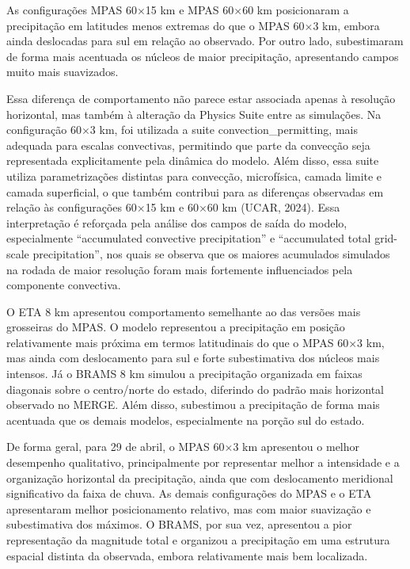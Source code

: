 \documentclass[12pt,a4paper,oneside]{book}
\begin{document}
As configurações MPAS 60$\times$15 km e MPAS 60$\times$60 km posicionaram a precipitação em latitudes menos extremas do que o MPAS 60$\times$3 km, embora ainda deslocadas para sul em relação ao observado. Por outro lado, subestimaram de forma mais acentuada os núcleos de maior precipitação, apresentando campos muito mais suavizados.

Essa diferença de comportamento não parece estar associada apenas à resolução horizontal, mas também à alteração da Physics Suite entre as simulações. Na configuração 60$\times$3 km, foi utilizada a suite convection\_permitting, mais adequada para escalas convectivas, permitindo que parte da convecção seja representada explicitamente pela dinâmica do modelo. Além disso, essa suite utiliza parametrizações distintas para convecção, microfísica, camada limite e camada superficial, o que também contribui para as diferenças observadas em relação às configurações 60$\times$15 km e 60$\times$60 km (UCAR, 2024). Essa interpretação é reforçada pela análise dos campos de saída do modelo, especialmente ``accumulated convective precipitation'' e ``accumulated total grid-scale precipitation'', nos quais se observa que os maiores acumulados simulados na rodada de maior resolução foram mais fortemente influenciados pela componente convectiva.

O ETA 8 km apresentou comportamento semelhante ao das versões mais grosseiras do MPAS. O modelo representou a precipitação em posição relativamente mais próxima em termos latitudinais do que o MPAS 60$\times$3 km, mas ainda com deslocamento para sul e forte subestimativa dos núcleos mais intensos. Já o BRAMS 8 km simulou a precipitação organizada em faixas diagonais sobre o centro/norte do estado, diferindo do padrão mais horizontal observado no MERGE. Além disso, subestimou a precipitação de forma mais acentuada que os demais modelos, especialmente na porção sul do estado.

De forma geral, para 29 de abril, o MPAS 60$\times$3 km apresentou o melhor desempenho qualitativo, principalmente por representar melhor a intensidade e a organização horizontal da precipitação, ainda que com deslocamento meridional significativo da faixa de chuva. As demais configurações do MPAS e o ETA apresentaram melhor posicionamento relativo, mas com maior suavização e subestimativa dos máximos. O BRAMS, por sua vez, apresentou a pior representação da magnitude total e organizou a precipitação em uma estrutura espacial distinta da observada, embora relativamente mais bem localizada.
\end{document}
